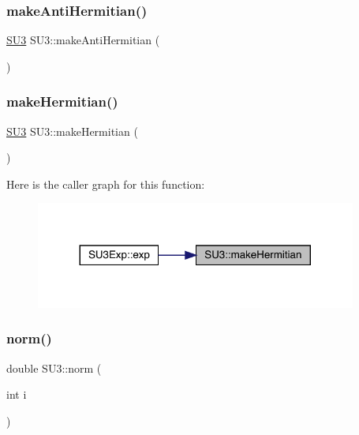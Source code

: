 \subsubsection{\texorpdfstring{makeAntiHermitian()}{makeAntiHermitian()}}
{\footnotesize\ttfamily \mbox{\hyperlink{class_s_u3}{S\+U3}} S\+U3\+::make\+Anti\+Hermitian (\begin{DoxyParamCaption}{ }\end{DoxyParamCaption})\hspace{0.3cm}{\ttfamily [inline]}}

\mbox{\label{class_s_u3_a7035a3e94f6dd27ece144b42473cade9}} 
\subsubsection{\texorpdfstring{makeHermitian()}{makeHermitian()}}
{\footnotesize\ttfamily \mbox{\hyperlink{class_s_u3}{S\+U3}} S\+U3\+::make\+Hermitian (\begin{DoxyParamCaption}{ }\end{DoxyParamCaption})\hspace{0.3cm}{\ttfamily [inline]}}

Here is the caller graph for this function\+:\nopagebreak
\begin{figure}[H]
\begin{center}
\leavevmode
\includegraphics[width=299pt]{class_s_u3_a7035a3e94f6dd27ece144b42473cade9_icgraph}
\end{center}
\end{figure}
\mbox{\label{class_s_u3_a1f0faef4a7cf1a1a3e6ec525cef55561}} 
\subsubsection{\texorpdfstring{norm()}{norm()}}
{\footnotesize\ttfamily double S\+U3\+::norm (\begin{DoxyParamCaption}\item[{int}]{i }\end{DoxyParamCaption})}

